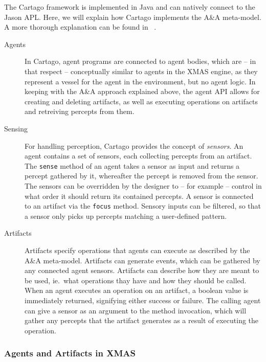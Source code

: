 The Cartago framework is implemented in Java and can natively connect
to the Jason APL. Here, we will explain how Cartago implements the
A\&A meta-model. A more thorough explanation can be found in ~\cite{Ricci11}.
\begin{description}
\item [{Agents}] In Cartago, agent programs are connected to agent bodies,
which are -- in that respect -- conceptually similar to agents in
the XMAS engine, as they represent a vessel for the agent in the environment,
but no agent logic. In keeping with the A\&A approach explained above,
the agent API allows for creating and deleting artifacts, as well
as executing operations on artifacts and retreiving percepts from
them. 
\item [{Sensing}] For handling perception, Cartago provides the concept
of \emph{sensors}. An agent contains a set of sensors, each collecting
percepts from an artifact. The \texttt{sense} method of an agent takes
a sensor as input and returns a percept gathered by it, whereafter
the percept is removed from the sensor. The sensors can be overridden
by the designer to -- for example -- control in what order it should
return its contained percepts. A sensor is connected to an artifact
via the \texttt{focus} method. Sensory inputs can be filtered, so
that a sensor only picks up percepts matching a user-defined pattern.
\item [{Artifacts}] Artifacts specify operations that agents can execute
as described by the A\&A meta-model. Artifacts can generate events,
which can be gathered by any connected agent sensors. Artifacts can
describe how they are meant to be used, ie.\ what operations thay
have and how they should be called. When an agent executes an operation
on an artifact, a boolean value is immediately returned, signifying
either success or failure. The calling agent can give a sensor as
an argument to the method invocation, which will gather any percepts
that the artifact generates as a result of executing the operation.
\end{description}

\subsubsection*{Agents and Artifacts in XMAS}

